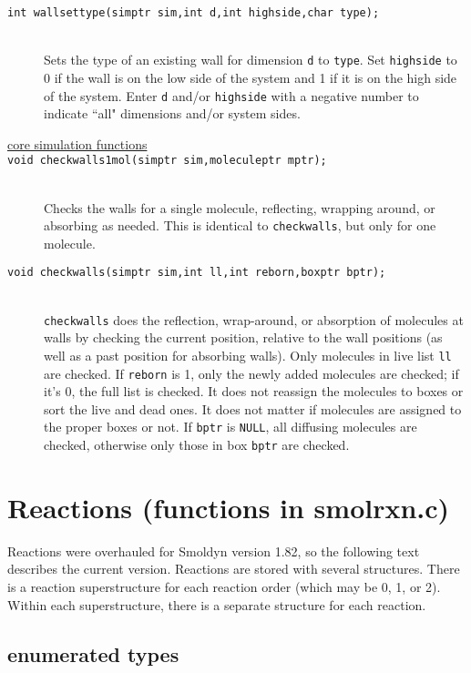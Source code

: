 \documentclass {scrbook}
\newcommand {\ttt} {\texttt}
\begin{document}
\begin{description}
\item[\ttt{int wallsettype(simptr sim,int d,int highside,char type);}]
\hfill \\
Sets the type of an existing wall for dimension \ttt{d} to \ttt{type}. Set \ttt{highside} to 0 if the wall is on the low side of the system and 1 if it is on the high side of the system. Enter \ttt{d} and/or \ttt{highside} with a negative number to indicate ``all" dimensions and/or system sides.

\item[\underline{core simulation functions}]

\item[\ttt{void checkwalls1mol(simptr sim,moleculeptr mptr);}]
\hfill \\
Checks the walls for a single molecule, reflecting, wrapping around, or absorbing as needed. This is identical to \ttt{checkwalls}, but only for one molecule.

\item[\ttt{void checkwalls(simptr sim,int ll,int reborn,boxptr bptr);}]
\hfill \\
\ttt{checkwalls} does the reflection, wrap-around, or absorption of molecules at walls by checking the current position, relative to the wall positions (as well as a past position for absorbing walls). Only molecules in live list \ttt{ll} are checked. If \ttt{reborn} is 1, only the newly added molecules are checked; if it's 0, the full list is checked. It does not reassign the molecules to boxes or sort the live and dead ones. It does not matter if molecules are assigned to the proper boxes or not. If \ttt{bptr} is \ttt{NULL}, all diffusing molecules are checked, otherwise only those in box \ttt{bptr} are checked.

\end{description}

\section{Reactions (functions in smolrxn.c)}

Reactions were overhauled for Smoldyn version 1.82, so the following text describes the current version. Reactions are stored with several structures. There is a reaction superstructure for each reaction order (which may be 0, 1, or 2). Within each superstructure, there is a separate structure for each reaction.

\subsection*{enumerated types}
\end{document}
